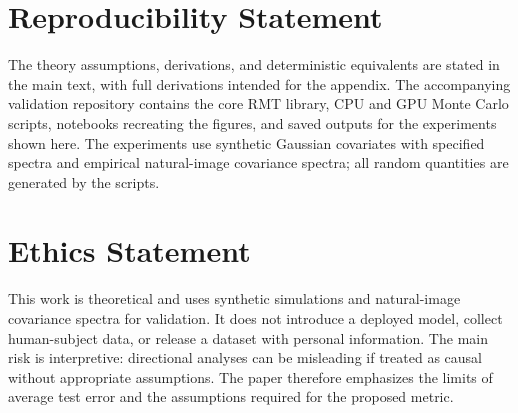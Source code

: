 \documentclass{article}
\theoremstyle{plain}
\theoremstyle{definition}
\theoremstyle{remark}
\begin{document}
\section{Reproducibility Statement}

The theory assumptions, derivations, and deterministic equivalents are stated in the main text, with full derivations intended for the appendix. The accompanying validation repository contains the core RMT library, CPU and GPU Monte Carlo scripts, notebooks recreating the figures, and saved outputs for the experiments shown here. The experiments use synthetic Gaussian covariates with specified spectra and empirical natural-image covariance spectra; all random quantities are generated by the scripts.

\section{Ethics Statement}

This work is theoretical and uses synthetic simulations and natural-image covariance spectra for validation. It does not introduce a deployed model, collect human-subject data, or release a dataset with personal information. The main risk is interpretive: directional analyses can be misleading if treated as causal without appropriate assumptions. The paper therefore emphasizes the limits of average test error and the assumptions required for the proposed metric.




\clearpage
\appendix
\tableofcontents{}


\end{document}
